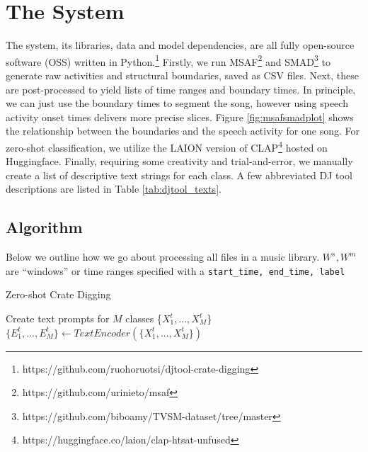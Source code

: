 \documentclass{article}
\newcommand{\code}{\texttt}
\begin{document}
\section{The System}\label{sec:system}

The system, its libraries, data and model dependencies, are all fully open-source software (OSS) written in Python.\footnote{https://github.com/ruohoruotsi/djtool-crate-digging} Firstly, we run MSAF\footnote{https://github.com/urinieto/msaf} and SMAD\footnote{https://github.com/biboamy/TVSM-dataset/tree/master} to generate raw activities and structural boundaries, saved as CSV files. Next, these are post-processed to yield lists of time ranges and boundary times. In principle, we can just use the boundary times to segment the song, however using speech activity onset times delivers more precise slices. Figure \ref{fig:msafsmadplot} shows the relationship between the boundaries and the speech activity for one song. For zero-shot classification, we utilize the LAION version of CLAP\footnote{https://huggingface.co/laion/clap-htsat-unfused} hosted on Huggingface\cite{WuClap2023}. Finally, requiring some creativity and trial-and-error, we manually create a list of descriptive text strings for each class. A few abbreviated DJ tool descriptions are listed in Table \ref{tab:djtool_texts}.

\subsection{Algorithm}\label{subsec:algo}
Below we outline how we go about processing all files in a music library. $W^{s}, W^{m}$ are ``windows'' or time ranges specified with a \code{start\_time, end\_time, label}

\begin{algorithm}
    \caption{Zero-shot Crate Digging}\label{combo_algo}
    	Create text prompts for $M$ classes \{$X^{t}_{1},...,X^{t}_{M}$\} \\
    	 $\{E^{t}_{1},...,E^{t}_{M}\} \gets TextEncoder(\{X^{t}_{1},...,X^{t}_{M}\})$ \\
		\BlankLine

\end{algorithm}
\end{document}
